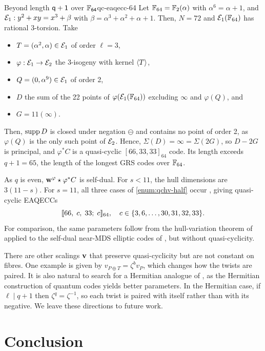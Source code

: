 \documentclass[twocolumn, 11pt]{scrartcl}
\begin{document}
\begin{example}{Beyond length $\sf{q+1}$ over $\sf{\bbF_{64}}$}{qc-eaqecc-64}
Let $\bbF_{64}=\bbF_2(\alpha)$ with $\alpha^6=\alpha+1$, and $\mcE_1:y^2+xy=x^3+\beta$ with $\beta=\alpha^3+\alpha^2+\alpha+1$. Then, $N=72$ and $\mcE_1(\bbF_{64})$ has rational 3-torsion. Take
\begin{itemize}
    \item $T=(\alpha^2,\alpha)\in\mcE_1$ of order $\ell=3$,
    \item $\varphi:\mcE_1\to\mcE_2$ the 3-isogeny with kernel $\ang T$,
    \item $Q=(0,\alpha^9)\in\mcE_1$ of order 2,
    \item $D$ the sum of the 22 points of $\varphi(\mcE_1(\bbF_{64}))$ excluding $\infty$ and $\varphi(Q)$, and
    \item $G=11(\infty)$.
\end{itemize}
Then, $\supp D$ is closed under negation $\ominus$ and contains no point of order 2, as $\varphi(Q)$ is the only such point of $\mcE_2$. Hence, $\Sigma(D)=\infty=\Sigma(2G)$, so $D-2G$ is principal, and $\varphi^*C$ is a quasi-cyclic $[66,33,33]_{64}$ code. Its length exceeds $q+1=65$, the length of the longest GRS codes over $\bbF_{64}$.

As $q$ is even, $\bfw^\varphi\star \varphi^*C$ is self-dual. For $s<11$, the hull dimensions are $3(11-s)$. For $s=11$, all three cases of \ref{enum:qchv-half} occur \cite{code-f64}, giving quasi-cyclic EAQECCs
\[ \llbracket66,\;c,\;33;\;c\rrbracket_{64},\quad c\in\set{3,6,\hdots,30,31,32,33}. \]
For comparison, the same parameters follow from the hull-variation theorem of \cite{chen2023hullvariation} applied to the self-dual near-MDS elliptic codes of \cite{jin2019selfdual}, but without quasi-cyclicity.
\end{example}

There are other scalings $\bfv$ that preserve quasi-cyclicity but are not constant on fibres. One example is given by $v_{P\oplus T}=\zeta^bv_P$, which changes how the twists are paired. It is also natural to search for a Hermitian analogue of , as the Hermitian construction of quantum codes yields better parameters. In the Hermitian case, if $\ell\mid q+1$ then $\zeta^q=\zeta^{-1}$, so each twist is paired with itself rather than with its negative. We leave these directions to future work.

\section{Conclusion} \label{section:conclusion}
\end{document}

